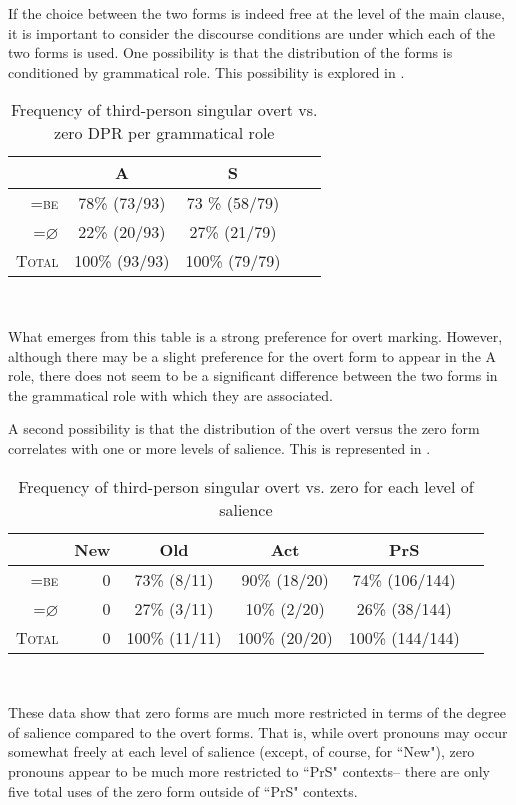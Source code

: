 If the choice between the two forms is indeed free at the level of the main clause, it is important to consider the discourse conditions are under which each of the two forms is used. One possibility is that the distribution of the forms is conditioned by grammatical role. This possibility is explored in .
\begin{table}[htp]
\begin{center}
\caption{\small{Frequency of third-person singular overt vs. zero DPR per grammatical role}}
\begin{tabular}{| r | c | c | c | c |}\hline
 & A & S \\
\hline
\textsc{=be} &  78{\%} (73/93) & 73 {\%} (58/79) \\
\hline
\textsc{=$\varnothing$} &  22{\%} (20/93)  &  27{\%} (21/79) \\
\hline
\textsc{Total} &  100{\%} (93/93) &  100{\%} (79/79)  \\
\hline
\end{tabular}\\
\label{overtvszero}
\end{center}
\end{table}
What emerges from this table is a strong preference for overt marking. However, although there may be a slight preference for the overt form to appear in the A role, there does not seem to be a significant difference between the two forms in the grammatical role with which they are associated.

A second possibility is that the distribution of the overt versus the zero form correlates with one or more levels of salience. This is represented in .
\begin{table}[htp]
\begin{center}
\caption{\small{Frequency of third-person singular overt vs. zero for each level of salience}}
\begin{tabular}{| r | r | c | c | c | c |}\hline
 & New & Old & Act & PrS \\
\hline
\textsc{=be} & 0 & 73{\%} (8/11) & 90{\%} (18/20) & 74{\%} (106/144) \\
\hline
\textsc{=$\varnothing$} & 0 & 27{\%} (3/11) & 10{\%} (2/20) & 26{\%} (38/144) \\
\hline
\textsc{Total} & 0 & 100{\%} (11/11) & 100{\%} (20/20) & 100{\%} (144/144)  \\
\hline
\end{tabular}\\
\label{overtvszerovsgiven}
\end{center}
\end{table}
These data show that zero forms are much more restricted in terms of the degree of salience compared to the overt forms. That is, while overt pronouns may occur somewhat freely at each level of salience (except, of course, for ``New"), zero pronouns appear to be much more restricted to ``PrS" contexts-- there are only five total uses of the zero form outside of ``PrS" contexts.


